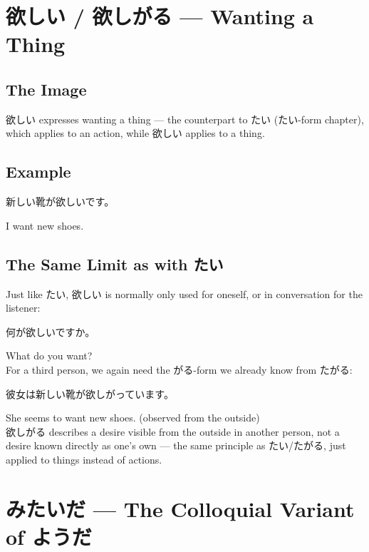 \documentclass[12pt]{book}
\begin{document}
\chapter{欲しい / 欲しがる — Wanting a Thing}

\section*{The Image}

欲しい expresses wanting a thing — the counterpart to たい (たい-form chapter), which applies to an action, while 欲しい applies to a thing.

\section*{Example}

\par\quad 新しい靴が欲しいです。\\
\par\quad I want new shoes.\\

\section*{The Same Limit as with たい}

Just like たい, 欲しい is normally only used for oneself, or in conversation for the listener:

\par\quad 何が欲しいですか。\\
\par\quad What do you want?\\

For a third person, we again need the がる-form we already know from たがる:

\par\quad 彼女は新しい靴が欲しがっています。\\
\par\quad She seems to want new shoes. (observed from the outside)\\

欲しがる describes a desire visible from the outside in another person, not a desire known directly as one's own — the same principle as たい/たがる, just applied to things instead of actions.


\chapter{みたいだ — The Colloquial Variant of ようだ}
\end{document}
